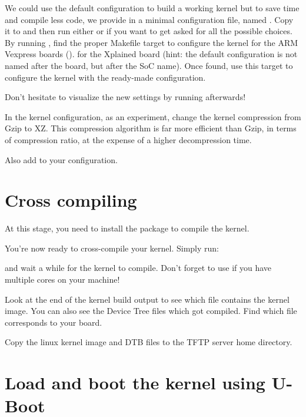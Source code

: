{
We could use the  default configuration to
build a working kernel but to save time and compile less code, we
provide in
 a minimal configuration
file, named . Copy it to  and
then run either  or  if
you want to get asked for all the possible choices.
}
{
By running , find the proper Makefile target to
configure the kernel
{for the ARM Vexpress boards ().}
{for the Xplained board (hint: the default
configuration is not named after the board, but after the SoC
name). Once found, use this target to configure the kernel with the
ready-made configuration.}
}

Don't hesitate to visualize the new settings by running
 afterwards!

In the kernel configuration, as an experiment, change the kernel
compression from Gzip to XZ. This compression algorithm is far more
efficient than Gzip, in terms of compression ratio, at the expense of
a higher decompression time.

{Also add  to your configuration.}
{}

\section{Cross compiling}

At this stage, you need to install the 
package to compile the kernel.

You're now ready to cross-compile your kernel. Simply run:


and wait a while for the kernel to compile. Don't forget to use
 if you have multiple cores on your machine!

Look at the end of the kernel build output to see which file contains
the kernel image. You can also see the Device Tree  files
which got compiled. Find which  file corresponds to your
board.

Copy the linux kernel image and DTB files to the TFTP server
home directory.

\section{Load and boot the kernel using U-Boot}

